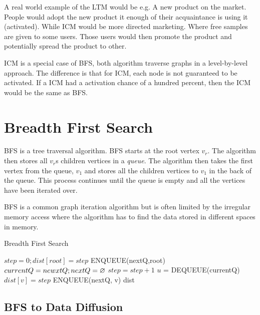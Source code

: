 A real world example of the LTM would be e.g. A new product on the market. People would adopt the new product it enough of their acquaintance is using it (activated). While ICM would be more directed marketing. Where free samples are given to some users. Those users would then promote the product and potentially spread the product to other.

ICM is a special case of BFS, both algorithm traverse graphs in a level-by-level approach. The difference is that for ICM, each node is not guaranteed to be activated. If a ICM had a activation chance of a hundred percent, then the ICM would be the same as BFS.


\section{Breadth First Search}
BFS is a tree traversal algorithm. BFS starts at the root vertex \textit{$v_r$}. The algorithm then stores all $v_r$s children vertices in a \textit{queue}. The algorithm then takes the first vertex from the queue, \textit{$v_1$} and stores all the children vertices to \textit{$v_1$} in the back of the queue. This process continues until the queue is empty and all the vertices have been iterated over. 

BFS is a common graph iteration algorithm but is often limited by the irregular memory access where the algorithm has to find the data stored in different spaces in memory.

\begin{algorithm}
\caption{Breadth First Search}
\begin{algorithmic}[1]
\State $step = 0; dist[root] = step$
\State ENQUEUE(nextQ,root)
\State $currentQ = newxtQ; nextQ = \oldemptyset$
\State $step = step+1$
\State$ u$ = DEQUEUE(currentQ)
\State $dist[v] = step$
\State ENQUEUE(nextQ, v)
\EndIf
\EndFor
\EndWhile
\EndWhile
\Return dist
\end{algorithmic}
\end{algorithm}


 
\subsection{BFS to Data Diffusion}

